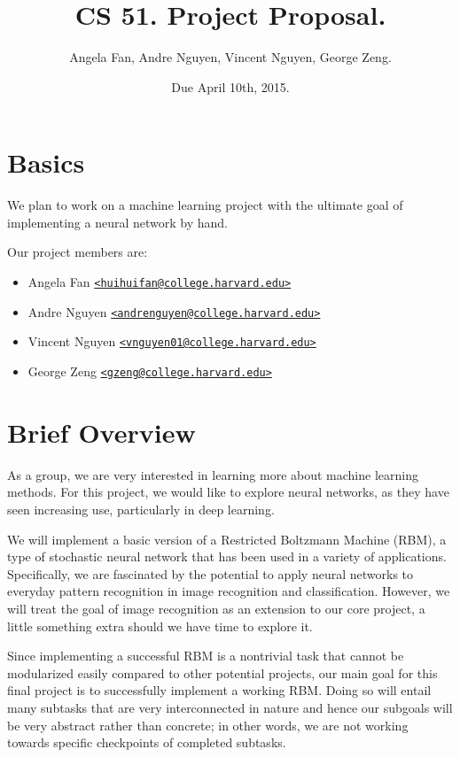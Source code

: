 \documentclass[12pt]{article}
\begin{document}
\title{CS 51. Project Proposal.}
\date{Due April 10th, 2015.}
\author{Angela Fan, Andre Nguyen, Vincent Nguyen, George Zeng.}
\maketitle

\section{Basics}
We plan to work on a machine learning project with the ultimate goal of implementing a neural network by hand.

Our project members are:
\begin{itemize}
  \item Angela Fan \href{mailto:huihuifan@college.harvard.edu}
    {\nolinkurl{<huihuifan@college.harvard.edu>}}
  \item Andre Nguyen \href{mailto:andrenguyen@college.harvard.edu}
    {\nolinkurl{<andrenguyen@college.harvard.edu>}}
  \item Vincent Nguyen \href{mailto:vnguyen01@college.harvard.edu}
    {\nolinkurl{<vnguyen01@college.harvard.edu>}}
  \item George Zeng \href{mailto:gzeng@college.harvard.edu}
    {\nolinkurl{<gzeng@college.harvard.edu>}}
\end{itemize}

\section{Brief Overview}
As a group, we are very interested in learning more about machine learning methods. For this project, we would like to explore neural networks, as they have seen increasing use, particularly in deep learning.

We will implement a basic version of a Restricted Boltzmann Machine (RBM), a type of stochastic neural network that has been used in a variety of applications. Specifically, we are fascinated by the potential to apply neural networks to everyday pattern recognition in image recognition and classification. However, we will treat the goal of image recognition as an extension to our core project, a little something extra should we have time to explore it. 

Since implementing a successful RBM is a nontrivial task that cannot be modularized easily compared to other potential projects, our main goal for this final project is to successfully implement a working RBM. Doing so will entail many subtasks that are very interconnected in nature and hence our subgoals will be very abstract rather than concrete; in other words, we are not working towards specific checkpoints of completed subtasks. 
\end{document}
